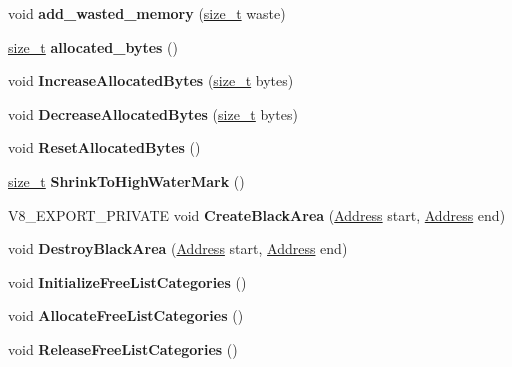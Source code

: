 \begin{DoxyCompactItemize}
\item 
\mbox{\label{classv8_1_1internal_1_1Page_a68fb9ae4874836d785b9274b928142de}} 
void {\bfseries add\+\_\+wasted\+\_\+memory} (\mbox{\hyperlink{classsize__t}{size\+\_\+t}} waste)
\item 
\mbox{\label{classv8_1_1internal_1_1Page_ab866910c6325031784803809529cb58b}} 
\mbox{\hyperlink{classsize__t}{size\+\_\+t}} {\bfseries allocated\+\_\+bytes} ()
\item 
\mbox{\label{classv8_1_1internal_1_1Page_a57ca2bd6ac8de9b12f3f79d5b5ca3f19}} 
void {\bfseries Increase\+Allocated\+Bytes} (\mbox{\hyperlink{classsize__t}{size\+\_\+t}} bytes)
\item 
\mbox{\label{classv8_1_1internal_1_1Page_a0802748589b64f5fddeb6082c99d1889}} 
void {\bfseries Decrease\+Allocated\+Bytes} (\mbox{\hyperlink{classsize__t}{size\+\_\+t}} bytes)
\item 
\mbox{\label{classv8_1_1internal_1_1Page_aa6a26eeba4a4beba82ac42c33f28cd6d}} 
void {\bfseries Reset\+Allocated\+Bytes} ()
\item 
\mbox{\label{classv8_1_1internal_1_1Page_a000ed40eb81b881825981e147175886c}} 
\mbox{\hyperlink{classsize__t}{size\+\_\+t}} {\bfseries Shrink\+To\+High\+Water\+Mark} ()
\item 
\mbox{\label{classv8_1_1internal_1_1Page_a569ee2e6696509d4318c7bd04c44a5a9}} 
V8\+\_\+\+E\+X\+P\+O\+R\+T\+\_\+\+P\+R\+I\+V\+A\+TE void {\bfseries Create\+Black\+Area} (\mbox{\hyperlink{classuintptr__t}{Address}} start, \mbox{\hyperlink{classuintptr__t}{Address}} end)
\item 
\mbox{\label{classv8_1_1internal_1_1Page_a5191c7648cb0f9a5c22d8dee0eb41b1c}} 
void {\bfseries Destroy\+Black\+Area} (\mbox{\hyperlink{classuintptr__t}{Address}} start, \mbox{\hyperlink{classuintptr__t}{Address}} end)
\item 
\mbox{\label{classv8_1_1internal_1_1Page_a40597daee0de4f3871eecd0611782b6f}} 
void {\bfseries Initialize\+Free\+List\+Categories} ()
\item 
\mbox{\label{classv8_1_1internal_1_1Page_aa27ea1672c2fa3e9fb279f13c1f3db0c}} 
void {\bfseries Allocate\+Free\+List\+Categories} ()
\item 
\mbox{\label{classv8_1_1internal_1_1Page_a7b5a4ad3287a5237871b4913b1710f5e}} 
void {\bfseries Release\+Free\+List\+Categories} ()
\end{DoxyCompactItemize}
